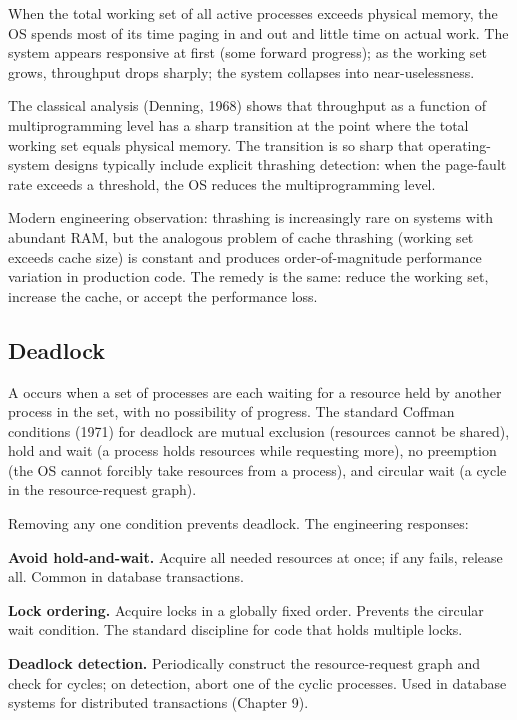 When the total working set of all active processes exceeds physical memory, the OS spends most of its time paging in and out and little time on actual work. The system appears responsive at first (some forward progress); as the working set grows, throughput drops sharply; the system collapses into near-uselessness.

The classical analysis (Denning, 1968) shows that throughput as a function of multiprogramming level has a sharp transition at the point where the total working set equals physical memory. The transition is so sharp that operating-system designs typically include explicit thrashing detection: when the page-fault rate exceeds a threshold, the OS reduces the multiprogramming level.

Modern engineering observation: thrashing is increasingly rare on systems with abundant RAM, but the analogous problem of cache thrashing (working set exceeds cache size) is constant and produces order-of-magnitude performance variation in production code. The remedy is the same: reduce the working set, increase the cache, or accept the performance loss.

\subsection{Deadlock}

A  occurs when a set of processes are each waiting for a resource held by another process in the set, with no possibility of progress. The standard Coffman conditions (1971) for deadlock are mutual exclusion (resources cannot be shared), hold and wait (a process holds resources while requesting more), no preemption (the OS cannot forcibly take resources from a process), and circular wait (a cycle in the resource-request graph).

Removing any one condition prevents deadlock. The engineering responses:

\textbf{Avoid hold-and-wait.} Acquire all needed resources at once; if any fails, release all. Common in database transactions.

\textbf{Lock ordering.} Acquire locks in a globally fixed order. Prevents the circular wait condition. The standard discipline for code that holds multiple locks.

\textbf{Deadlock detection.} Periodically construct the resource-request graph and check for cycles; on detection, abort one of the cyclic processes. Used in database systems for distributed transactions (Chapter 9).

